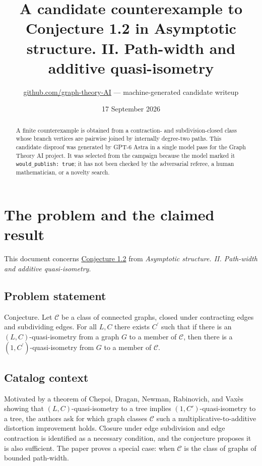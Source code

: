 \documentclass[
  11pt,
  a4paper,
]{article}
\title{A candidate counterexample to Conjecture 1.2 in Asymptotic
structure. II. Path-width and additive quasi-isometry}
\author{\href{https://github.com/graph-theory-AI}{github.com/graph-theory-AI}
--- machine-generated candidate writeup}
\date{17 September 2026}
\begin{document}
\maketitle
\begin{abstract}
A finite counterexample is obtained from a contraction- and
subdivision-closed class whose branch vertices are pairwise joined by
internally degree-two paths. This candidate disproof was generated by
GPT-6 Astra in a single model pass for the Graph Theory AI project. It
was selected from the campaign because the model marked it
\texttt{would\_publish:\ true}; it has not been checked by the
adversarial referee, a human mathematician, or a novelty search.
\end{abstract}

\section{The problem and the claimed
result}\label{the-problem-and-the-claimed-result}

This document concerns
\href{https://graph-theory-ai.github.io/graph-conjectures/arxiv/2509.09031__00/}{Conjecture
1.2} from \emph{Asymptotic structure. II. Path-width and additive
quasi-isometry}.

\subsection{Problem statement}\label{problem-statement}

Conjecture. Let \(\mathcal{C}\) be a class of connected graphs, closed
under contracting edges and subdividing edges. For all \(L,C\) there
exists \(C^{\prime}\) such that if there is an \((L,C)\)-quasi-isometry
from a graph \(G\) to a member of \(\mathcal{C}\), then there is a
\((1,C^{\prime})\)-quasi-isometry from \(G\) to a member of
\(\mathcal{C}\).

\subsection{Catalog context}\label{catalog-context}

Motivated by a theorem of Chepoi, Dragan, Newman, Rabinovich, and Vaxès
showing that \((L,C)\)-quasi-isometry to a tree implies
\((1,C')\)-quasi-isometry to a tree, the authors ask for which graph
classes \(\mathcal{C}\) such a multiplicative-to-additive distortion
improvement holds. Closure under edge subdivision and edge contraction
is identified as a necessary condition, and the conjecture proposes it
is also sufficient. The paper proves a special case: when
\(\mathcal{C}\) is the class of graphs of bounded path-width.
\end{document}
